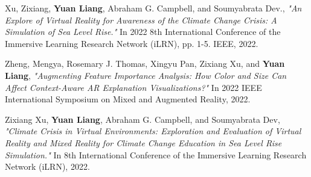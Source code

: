 \documentclass[final,british,a4paper,12pt]{phdthesis}
\begin{document}
\begin{listofpublications}
Xu, Zixiang, \textbf{Yuan Liang}, Abraham G. Campbell, and Soumyabrata Dev., \textit{"An Explore of Virtual Reality for Awareness of the Climate Change Crisis: A Simulation of Sea Level Rise."} In 2022 8th International Conference of the Immersive Learning Research Network (iLRN), pp. 1-5. IEEE, 2022.

\vspace{10mm}

Zheng, Mengya, Rosemary J. Thomas, Xingyu Pan, Zixiang Xu, and \textbf{Yuan Liang}, \textit{"Augmenting Feature Importance Analysis: How Color and Size Can Affect Context-Aware AR Explanation Visualizations?"} In 2022 IEEE International Symposium on Mixed and Augmented Reality, 2022.

\vspace{10mm}

Zixiang Xu, \textbf{Yuan Liang}, Abraham G. Campbell, and Soumyabrata Dev,  \textit{"Climate Crisis in Virtual Environments: Exploration and Evaluation of Virtual Reality and Mixed Reality for Climate Change Education in Sea Level Rise Simulation."} In 8th International Conference of the Immersive Learning Research Network (iLRN), 2022.

\end{listofpublications}
\end{document}
